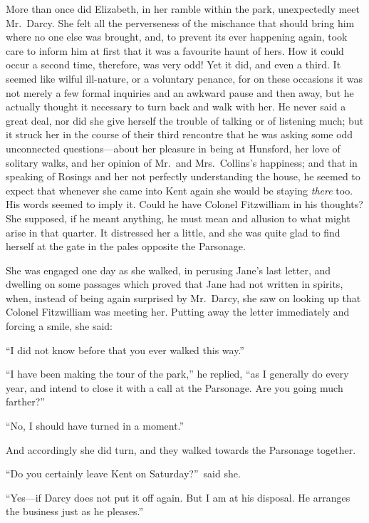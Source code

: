 \documentclass[12pt,english]{book}
\begin{document}
More than once did Elizabeth, in her ramble within the park, unexpectedly
meet Mr.\ Darcy. She felt all the perverseness of the mischance that
should bring him where no one else was brought, and, to prevent its
ever happening again, took care to inform him at first that it was
a favourite haunt of hers. How it could occur a second time, therefore,
was very odd! Yet it did, and even a third. It seemed like wilful
ill-nature, or a voluntary penance, for on these occasions it was
not merely a few formal inquiries and an awkward pause and then away,
but he actually thought it necessary to turn back and walk with her.
He never said a great deal, nor did she give herself the trouble of
talking or of listening much; but it struck her in the course of their
third rencontre that he was asking some odd unconnected questions\mbox{---}about
her pleasure in being at Hunsford, her love of solitary walks, and
her opinion of Mr.\ and Mrs.\ Collins's happiness; and that in speaking
of Rosings and her not perfectly understanding the house, he seemed
to expect that whenever she came into Kent again she would be staying
\textit{there} too. His words seemed to imply it. Could he have Colonel
Fitzwilliam in his thoughts? She supposed, if he meant anything, he
must mean and allusion to what might arise in that quarter. It distressed
her a little, and she was quite glad to find herself at the gate in
the pales opposite the Parsonage.

She was engaged one day as she walked, in perusing Jane's last letter,
and dwelling on some passages which proved that Jane had not written
in spirits, when, instead of being again surprised by Mr.\ Darcy,
she saw on looking up that Colonel Fitzwilliam was meeting her. Putting
away the letter immediately and forcing a smile, she said:

{}``I did not know before that you ever walked this way.''

{}``I have been making the tour of the park,'' he replied, {}``as
I generally do every year, and intend to close it with a call at the
Parsonage. Are you going much farther?''\ 

{}``No, I should have turned in a moment.''

And accordingly she did turn, and they walked towards the Parsonage
together.

{}``Do you certainly leave Kent on Saturday?''\ said she.

{}``Yes\mbox{---}if Darcy does not put it off again. But I am at
his disposal. He arranges the business just as he pleases.''
\end{document}
